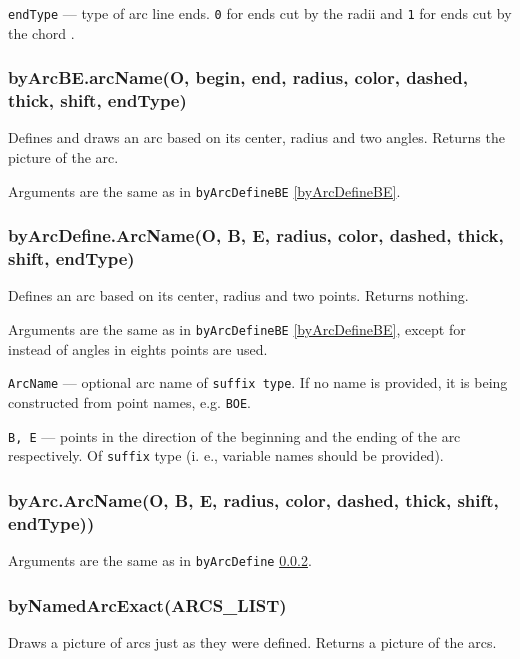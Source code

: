 \documentclass{ltxdoc}
\begin{document}
	\texttt{endType} — type of arc line ends. \texttt{0} for ends cut by the radii
	and \texttt{1} for ends cut by the chord
	.

\subsubsection{byArcBE.arcName(O, begin, end, radius, color, dashed, thick, shift, endType)}\label{byArcBE}

	Defines and draws an arc based on its center, radius and two angles. Returns the picture of the arc.
	
	Arguments are the same as in \texttt{byArcDefineBE} \ref{byArcDefineBE}.

\subsubsection{byArcDefine.ArcName(O, B, E, radius, color, dashed, thick, shift, endType)}\label{byArcDefine}
	
	Defines an arc based on its center, radius and two points. Returns nothing.
	
	Arguments are the same as in \texttt{byArcDefineBE} \ref{byArcDefineBE}, except for instead of angles in eights points are used.
	
	\texttt{ArcName} — optional arc name of \texttt{suffix type}. If no name is provided, it is being constructed from point names, e.g. \texttt{BOE}.
	
	\texttt{B, E} — points in the direction of the beginning and the ending of the arc respectively. Of \texttt{suffix} type (i. e., variable names should be provided).

\subsubsection{byArc.ArcName(O, B, E, radius, color, dashed, thick, shift, endType))}\label{byArc}
	
	Arguments are the same as in \texttt{byArcDefine} \ref{byArcDefine}.
	
\subsubsection{byNamedArcExact(ARCS\_LIST)}\label{byNamedArcExact}
	Draws a picture of arcs just as they were defined. Returns a picture of the arcs.
	
\end{document}
